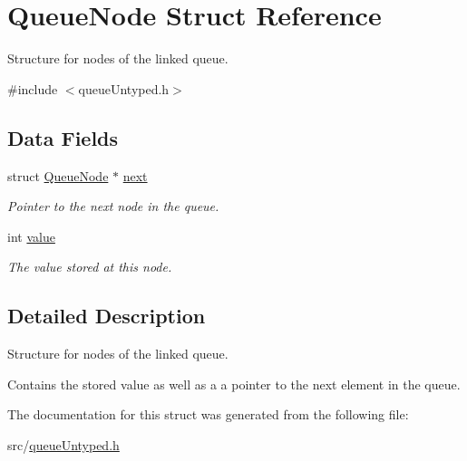 \hypertarget{structQueueNode}{\section{Queue\-Node Struct Reference}
\label{structQueueNode}
}


Structure for nodes of the linked queue.  




{\ttfamily \#include $<$queue\-Untyped.\-h$>$}

\subsection*{Data Fields}
\begin{DoxyCompactItemize}
\item 
\hypertarget{structQueueNode_a62c1c1f34bb19461763b618bbc8b6213}{struct \hyperlink{structQueueNode}{Queue\-Node} $\ast$ \hyperlink{structQueueNode_a62c1c1f34bb19461763b618bbc8b6213}{next}}\label{structQueueNode_a62c1c1f34bb19461763b618bbc8b6213}

\begin{DoxyCompactList}\small\item\em Pointer to the next node in the queue. \end{DoxyCompactList}\item 
\hypertarget{structQueueNode_a057c9712b2f123c9009759bfcfe8a033}{int \hyperlink{structQueueNode_a057c9712b2f123c9009759bfcfe8a033}{value}}\label{structQueueNode_a057c9712b2f123c9009759bfcfe8a033}

\begin{DoxyCompactList}\small\item\em The value stored at this node. \end{DoxyCompactList}\end{DoxyCompactItemize}


\subsection{Detailed Description}
Structure for nodes of the linked queue. 

Contains the stored value as well as a a pointer to the next element in the queue. 

The documentation for this struct was generated from the following file\-:\begin{DoxyCompactItemize}
\item 
src/\hyperlink{queueUntyped_8h}{queue\-Untyped.\-h}\end{DoxyCompactItemize}
